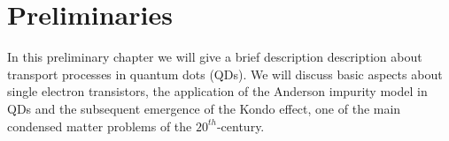 \chapter{Preliminaries \label{chap:Preliminaries}}



In this preliminary chapter we will give a brief description description about transport processes in quantum dots (QDs). We will discuss basic aspects about single electron transistors, the application of the Anderson impurity model in QDs and the subsequent emergence of the Kondo effect, one of the main condensed matter problems of the $20^{th}$-century. 

